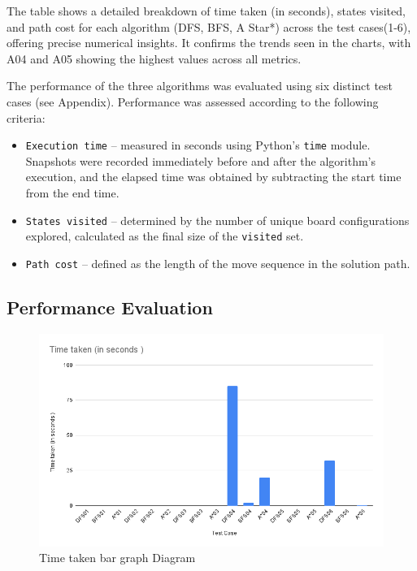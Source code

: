\documentclass[journal]{./IEEE/IEEEtran}
\begin{document}
The table shows a detailed  breakdown of time taken (in seconds), states visited, and path cost for each 
algorithm (DFS, BFS, A Star*) across the test cases(1-6), offering precise numerical insights. It confirms 
the trends seen in the charts, with A04 and A05 showing the highest values across all metrics. 

The performance of the three algorithms was evaluated using six distinct test cases (see Appendix). 
Performance was assessed according to the following criteria:

\begin{itemize}
    \item \texttt{Execution time} – measured in seconds using Python's \texttt{time} module. Snapshots were recorded immediately before and after the algorithm’s execution, and the elapsed time was obtained by subtracting the start time from the end time.  
    \item \texttt{States visited} – determined by the number of unique board configurations explored, calculated as the final size of the \texttt{visited} set.  
    \item \texttt{Path cost} – defined as the length of the move sequence in the solution path.  
\end{itemize}

\subsection{Performance Evaluation}
\begin{figure}[H]
    \centering
    \includegraphics[width=1\linewidth]{pictures-Elisha/Time taken (in seconds ).png}
    \caption{Time taken bar graph Diagram}
    \label{fig:time_bar_graph}
\end{figure}
\end{document}
